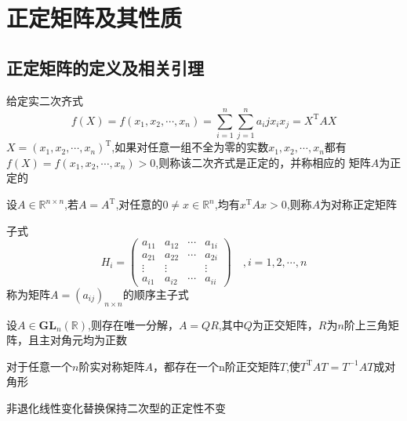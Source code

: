 
\large{}
\chapter{正定矩阵及其性质}\label{sec:2two}
\section{正定矩阵的定义及相关引理}
\begin{definition}\label{defin:1}
    给定实二次齐式
    $$f(X)=f(x_1,x_2,\cdots,x_n)=\sum_{i=1}^n \sum_{j=1}^{n}a_ij x_i x_j =X^\mathrm{T}AX$$
    $X=(x_1,x_2,\cdots,x_n)^\mathrm{T}$,如果对任意一组不全为零的实数$x_1,x_2,\cdots,x_n$都有$f(X)=f(x_1,x_2,\cdots,x_n)>0$,则称该二次齐式是正定的，并称相应的
    矩阵$A$为正定的
\end{definition}
\begin{definition}
    设$A \in \mathbb{R}^{n \times n}$,若$A=A^\mathrm{T}$,对任意的$0\neq x \in \mathbb{R}^n $,均有$x^\mathrm{T}Ax>0$,则称$A$为对称正定矩阵
\end{definition}
\begin{definition}
    子式
    \[
H_{i}=\begin{pmatrix}
        a_{11} & a_{12} & \cdots & a_{1i}\\
        a_{21} & a_{22} & \cdots & a_{2i} \\
        \vdots & \vdots &        & \vdots \\
        a_{i1} & a_{i2} & \cdots & a_{ii}
    \end{pmatrix}\quad,i=1,2,\cdots,n
    \]称为矩阵$A=(a_{ij})_{n \times n}$的顺序主子式
\end{definition}
\begin{lemma}[QR分解]
    设$A\in \mathbf{GL}_n(\mathbb{R})$,则存在唯一分解，$A=QR$,其中$Q$为正交矩阵，$R$为$n$阶上三角矩阵，且主对角元均为正数
\end{lemma}
\begin{lemma}\label{le_1}
    对于任意一个$n$阶实对称矩阵$A$，都存在一个n阶正交矩阵$T$,使$T^\mathrm{T}AT=T^{-1}AT$成对角形
\end{lemma}
\begin{lemma}\label{le_2}
    非退化线性变化替换保持二次型的正定性不变
\end{lemma}
